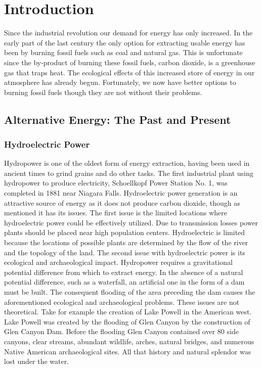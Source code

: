 \chapter{Introduction}\label{chap:intro}

Since the industrial revolution our demand for energy has only increased.
In the early part of the last century the only option for extracting usable energy has been by burning fossil fuels such as coal and natural gas. This is unfortunate since the by-product of burning these fossil fuels, carbon dioxide, is a greenhouse gas that traps heat. The ecological effects of this increased store of energy in our atmosphere has already begun. 
Fortunately, we now have better options to burning fossil fuels though they are not without their problems.

\section{Alternative Energy: The Past and Present}
\subsection{Hydroelectric Power}
Hydropower is one of the oldest form of energy extraction, having been used in ancient times to grind grains and do other tasks. The first industrial plant using hydropower to produce electricity, Schoellkopf Power Station No. 1, was completed in 1881 near Niagara Falls\cite{schoellkopf}. Hydroelectric power generation is an attractive source of energy as it does not produce carbon dioxide, though as mentioned it has its issues. The first issue is the limited locations where hydroelectric power could be effectively utilized. Due to transmission losses power plants should be placed near high population centers. Hydroelectric is limited because the locations of possible plants are determined by the flow of the river and the topology of the land. The second issue with hydroelectric power is its ecological and archaeological impact. Hydropower requires a gravitational potential difference from which to extract energy. In the absence of a natural potential difference, such as a waterfall, an artificial one in the form of a dam must be built. The consequent flooding of the area preceding the dam causes the aforementioned ecological and archaeological problems. These issues are not theoretical. Take for example the creation of Lake Powell in the American west. Lake Powell was created by the flooding of Glen Canyon by the construction of Glen Canyon Dam. Before the flooding Glen Canyon contained over 80 side canyons, clear streams, abundant wildlife, arches, natural bridges, and numerous Native American archaeological sites. All that history and natural splendor was lost under the water.

